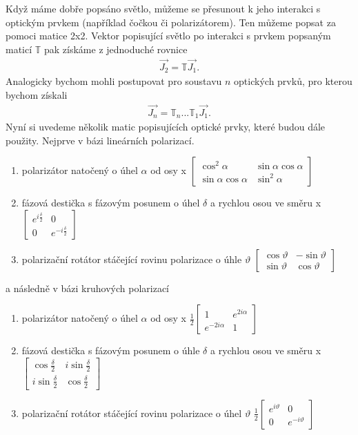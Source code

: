Když máme dobře popsáno světlo, můžeme se přesunout k jeho interakci s optickým prvkem (například čočkou či polarizátorem). Ten můžeme popsat za pomoci matice 2x2. Vektor popisující světlo po interakci s prvkem popsaným maticí $\mathbb{T}$ pak získáme z jednoduché rovnice
\begin{eqnarray}
\vec{J_2}=\mathbb{T}\vec{J_1}.
\end{eqnarray}
Analogicky bychom mohli postupovat pro soustavu $n$ optických prvků, pro kterou bychom získali
\begin{eqnarray}
\vec{J_n}=\mathbb{T}_n...\mathbb{T}_1\vec{J_1}.
\end{eqnarray}
Nyní si uvedeme několik matic popisujících optické prvky, které budou dále použity. Nejprve v bázi lineárních polarizací.
\begin{enumerate}
\item polarizátor natočený o úhel $\alpha$ od osy x $\begin{bmatrix} \cos^2\alpha & \sin\alpha\cos\alpha \\ \sin\alpha\cos\alpha & \sin^2\alpha \end{bmatrix}$
\item fázová destička s fázovým posunem o úhel $\delta$ a rychlou osou ve směru x $\begin{bmatrix} e^{i\frac{\delta}{2}} & 0 \\ 0 & e^{-i\frac{\delta}{2}} \end{bmatrix}$
\item polarizační rotátor stáčející rovinu polarizace o úhle $\vartheta$ $\begin{bmatrix} \cos\vartheta & -\sin\vartheta \\ \sin\vartheta & \cos\vartheta \end{bmatrix}$
\end{enumerate}
a následně v bázi kruhových polarizací
\begin{enumerate}
\item polarizátor natočený o úhel $\alpha$ od osy x  $\frac{1}{2}\begin{bmatrix} 1 & e^{2i\alpha} \\ e^{-2i\alpha} & 1 \end{bmatrix}$
\item fázová destička s fázovým posunem o úhle $\delta$ a rychlou osou ve směru x  $\begin{bmatrix} \cos\frac{\delta}{2} & i\sin\frac{\delta}{2} \\ i\sin\frac{\delta}{2} & \cos\frac{\delta}{2} \end{bmatrix}$
\item polarizační rotátor stáčející rovinu polarizace o úhel $\vartheta$ $\frac{1}{2}\begin{bmatrix} e^{i\vartheta} & 0 \\ 0 & e^{-i\vartheta} \end{bmatrix}$
\end{enumerate}
